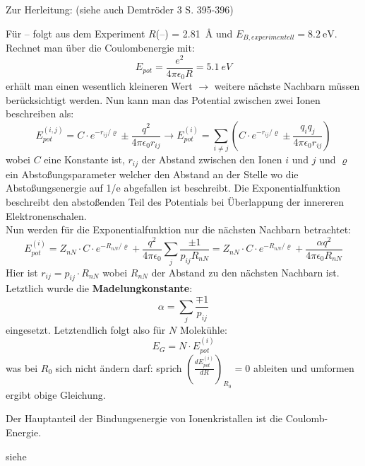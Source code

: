Zur Herleitung: (siehe auch Demtröder 3 S. 395-396)

Für -- folgt aus dem Experiment $R$(--) = \SI{2.81}{\angstrom} und $E_{B,experimentell} = \SI{8.2}{\electronvolt}$.
Rechnet man über die Coulombenergie mit: 
\[E_{pot} = \frac{e^2}{4\pi\epsilon_0 R} = \SI{5.1}{eV}\]
erhält man einen wesentlich kleineren Wert $\rightarrow$ weitere nächste Nachbarn müssen berücksichtigt werden.
Nun kann man das Potential zwischen zwei Ionen beschreiben als: 
\[E_{pot}^{(i,j)} = C \cdot e^{-r_{ij}/\varrho}\pm \frac{q^2}{4\pi\epsilon_0 r_{ij}} \rightarrow E_{pot}^{(i)} = \sum_{i \ne j} \left( C \cdot e^{-r_{ij}/\varrho}\pm \frac{q_i q_j}{4\pi\epsilon_0 r_{ij}} \right)\]
wobei $C$ eine Konstante ist, $r_{ij}$ der Abstand zwischen den Ionen $i$ und $j$ und $\varrho$ ein Abstoßungsparameter welcher den Abstand an der Stelle wo die Abstoßungsenergie auf 1/e abgefallen ist beschreibt. Die Exponentialfunktion beschreibt den abstoßenden Teil des Potentials bei Überlappung der innereren Elektronenschalen. \\
Nun werden für die Exponentialfunktion nur die nächsten Nachbarn betrachtet: 
\[E_{pot}^{(i)} = Z_{nN} \cdot C \cdot e^{-R_{nN}/\varrho}+\frac{q^2}{4\pi\epsilon_0} \sum_j\frac{\pm 1}{p_{ij}R_{nN}} = Z_{nN} \cdot C \cdot e^{-R_{nN}/\varrho}+\frac{\alpha q^2}{4\pi\epsilon_0 R_{nN}}\]
Hier ist $r_{ij} = p_{ij} \cdot R_{nN}$ wobei $R_{nN}$ der Abstand zu den nächsten Nachbarn ist. Letztlich wurde die \textbf{Madelungkonstante}: 
\[\alpha = \sum_j \frac{\mp 1}{p_{ij}}\]
eingesetzt. Letztendlich folgt also für $N$ Molekühle: \\

\[E_G = N \cdot E_{pot}^{(i)}\]
was bei $R_0$ sich nicht ändern darf: sprich $\left(\frac{d E_{pot}^{(i)}}{d R}\right)_{R_0} = 0$ ableiten und umformen ergibt obige Gleichung. 

Der Hauptanteil der Bindungsenergie von Ionenkristallen ist die Coulomb-Energie. 

\label{q:66}

\label{q:67}

siehe 

\label{q:68}

